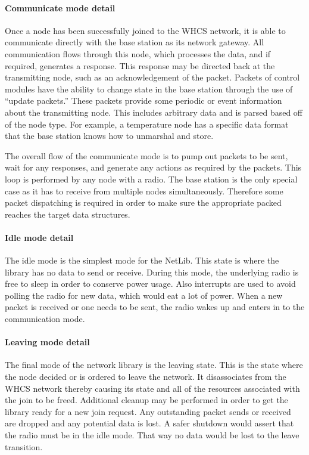 \paragraph{Communicate mode detail}
Once a node has been successfully joined to the WHCS network, it is able
to communicate directly with the base station as its network gateway. All
communication flows through this node, which processes the data, and if
required, generates a response. This response may be directed back at the
transmitting node, such as an acknowledgement of the packet. Packets of control
modules have the ability to change state in the base station through the use of
``update packets.'' These packets provide some periodic or event
information about the transmitting node. This includes arbitrary data and
is parsed based off of the node type. For example, a temperature node has
a specific data format that the base station knows how to unmarshal and
store.

The overall flow of the communicate mode is to pump out packets to be
sent, wait for any responses, and generate any actions as required by the
packets. This loop is performed by any node with a radio. The base station
is the only special case as it has to receive from multiple nodes
simultaneously. Therefore some packet dispatching is required in order to
make sure the appropriate packed reaches the target data structures.

\paragraph{Idle mode detail}
The idle mode is the simplest mode for the NetLib. This state is where the
library has no data to send or receive. During this mode, the underlying radio
is free to sleep in order to conserve power usage. Also interrupts are
used to avoid polling the radio for new data, which would eat a lot of power.
When a new packet is received or one needs to be sent, the radio wakes up
and enters in to the communication mode.

\paragraph{Leaving mode detail}
The final mode of the network library is the leaving state. This is the state
where the node decided or is ordered to leave the network. It disassociates
from the WHCS network thereby causing its state and all of the resources
associated with the join to be freed. Additional cleanup may be performed in
order to get the library ready for a new join request. Any outstanding packet
sends or received are dropped and any potential data is lost.
A safer shutdown would assert that the radio must be in the idle mode. That way
no data would be lost to the leave transition.

